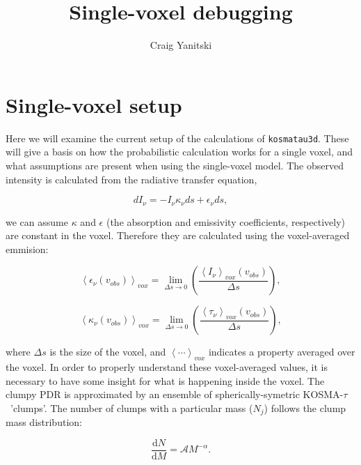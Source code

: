 \documentclass[a4paper]{article}
\newcommand{\kosmatau}{KOSMA-\(\tau\)}
\begin{document}
    \title{Single-voxel debugging}
    \author{Craig Yanitski}
    \maketitle

    \section{Single-voxel setup}
    \label{setup}

    Here we will examine the current setup of the calculations of \texttt{kosmatau3d}.
    These will give a basis on how the probabilistic calculation works for a single voxel, and what assumptions are present when using the single-voxel model.
    The observed intensity is calculated from the radiative transfer equation,

    \begin{equation}
    \label{radiative transfer equation}
    dI_\nu = - I_\nu \kappa_\nu ds + \epsilon_\nu ds,
    \end{equation}

    we can assume \(\kappa\) and \(\epsilon\) (the absorption and emissivity coefficients, respectively) are constant in the voxel.
    Therefore they are calculated using the voxel-averaged emmision:

    \begin{equation}
    \label{voxel-averaged emissivity}
    \left<\epsilon_\nu (v_{obs})\right>_{vox} = \lim_{\Delta s \to 0} \left( \frac{\left<I_\nu\right>_{vox} (v_{obs})}{\Delta s} \right),
    \end{equation}

    \begin{equation}
    \label{voxel-averaged opacity}
    \left<\kappa_\nu (v_{obs})\right>_{vox} = \lim_{\Delta s \to 0} \left( \frac{\left<\tau_\nu\right>_{vox} (v_{obs})}{\Delta s} \right),
    \end{equation}

    where \(\Delta s\) is the size of the voxel, and \(\left< \cdots \right>_{vox}\) indicates a property averaged over the voxel.
    In order to properly understand these voxel-averaged values, it is necessary to have some insight for what is happening inside the voxel.
    The clumpy PDR is approximated by an ensemble of spherically-symetric \kosmatau \ 'clumps'.
    The number of clumps with a particular mass (\(N_j\)) follows the clump mass distribution:

    \begin{equation}
    \label{mass function}
    \frac{\mathrm{d}N}{\mathrm{d}M} = \mathcal{A} M^{-\alpha}.
    \end{equation}
\end{document}

